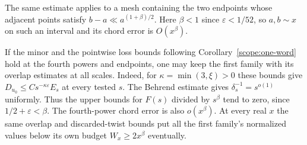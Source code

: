 The same estimate applies to a mesh containing the two endpoints
whose adjacent points satisfy \(b-a\ll a^{(1+\beta)/2}\). Here
\(\beta<1\) since \(\varepsilon<1/52\), so \(a,b\sim x\) on such
an interval and its chord error is \(O(x^\beta)\).

If the minor and the pointwise loss bounds following
Corollary~\ref{scope:one-word} hold at the fourth powers and endpoints,
one may keep the first family with its overlap estimates at all scales.
Indeed, for \(\kappa=\min(3,\xi)>0\) these bounds give
\(D_{u_0}\le C s^{-\kappa\varepsilon}E_s\) at every tested \(s\).
The Behrend estimate gives \(\delta_s^{-1}=s^{o(1)}\) uniformly.
Thus the upper bounds for \(F(s)\) divided by \(s^\beta\) tend to
zero, since \(1/2+\varepsilon<\beta\). The fourth-power chord error
is also \(o(x^\beta)\). At every real \(x\) the same overlap and
discarded-twist bounds put all the first family's normalized values
below its own budget \(W_x\ge2x^\beta\) eventually.

